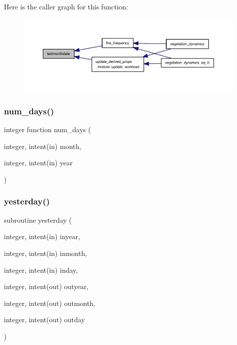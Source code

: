 Here is the caller graph for this function\+:
\nopagebreak
\begin{figure}[H]
\begin{center}
\leavevmode
\includegraphics[width=350pt]{invmondays_8f90_a6d8d52f8e0c5ef504c1a38a72cda5b01_icgraph}
\end{center}
\end{figure}
\mbox{\label{invmondays_8f90_ac5102abe4057964dceefd23fb743bc67}} 
\subsubsection{\texorpdfstring{num\+\_\+days()}{num\_days()}}
{\footnotesize\ttfamily integer function num\+\_\+days (\begin{DoxyParamCaption}\item[{integer, intent(in)}]{month,  }\item[{integer, intent(in)}]{year }\end{DoxyParamCaption})}

\mbox{\label{invmondays_8f90_a793b0c319548b2101ffe071aabc0f2f2}} 
\subsubsection{\texorpdfstring{yesterday()}{yesterday()}}
{\footnotesize\ttfamily subroutine yesterday (\begin{DoxyParamCaption}\item[{integer, intent(in)}]{inyear,  }\item[{integer, intent(in)}]{inmonth,  }\item[{integer, intent(in)}]{inday,  }\item[{integer, intent(out)}]{outyear,  }\item[{integer, intent(out)}]{outmonth,  }\item[{integer, intent(out)}]{outday }\end{DoxyParamCaption})}

